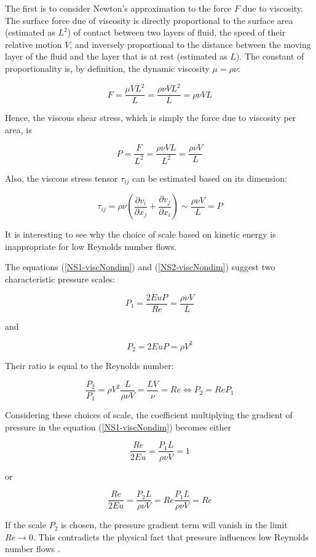 The first is to consider Newton's approximation to the force $F$ due to viscosity\cite{zorich}. The surface force due of viscosity is directly proportional to the surface area (estimated as $L^2$) of contact between two layers of fluid, the speed of their relative motion $V$, and inversely proportional to the distance between the moving layer of the fluid and the layer that is at rest (estimated as $L$). The constant of proportionality is, by definition, the dynamic viscosity $\mu = \rho \nu$:

$$ F = \frac{\mu V L^2}{L} = \frac{\rho \nu V L^2}{L} = \rho \nu VL$$

Hence, the viscous shear stress, which is simply the force due to viscosity per area, is

$$ P = \frac{F}{L^2} = \frac{\rho \nu V L}{L^2} = \frac{\rho \nu V}{L}$$

Also, the viscous stress tensor $\tau_{ij}$ can be estimated based on its dimension: 

$$ \tau_{ij} = \rho \nu (\frac{\partial v_i}{\partial x_j} + \frac{\partial v_j}{\partial x_i}) \sim \frac{\rho \nu V}{L} = P $$

It is interesting to see why the choice of scale based on kinetic energy is inappropriate for low Reynolds number flows.

The equations (\ref{NS1-viscNondim}) and (\ref{NS2-viscNondim}) suggest two characteristic pressure scales:

$$ P_1 = \frac{2EuP}{Re} = \frac{\rho \nu V}{L}$$

and

$$ P_2 = 2EuP  = \rho V^2$$


Their ratio is equal to the Reynolds number:

$$ \frac{P_2}{P_1} = \rho V^2 \frac{L}{\rho \nu V} = \frac{LV}{\nu} = Re \Longleftrightarrow P_2 = Re P_1$$

Considering these choices of scale, the coefficient multiplying the gradient of pressure in the equation (\ref{NS1-viscNondim}) becomes either

$$ \frac{Re}{2 Eu} = \frac{P_1L}{\rho \nu V} = 1$$

or 

$$ \frac{Re}{2 Eu} = \frac{P_2L}{\rho \nu V} = Re \frac{P_1L}{\rho \nu V} = Re $$

If the scale $P_2$ is chosen, the pressure gradient term will vanish in the limit $ Re \longrightarrow 0$. This contradicts the physical fact that pressure influences low Reynolds number flows \cite[pp. 433-434]{leal}. 

